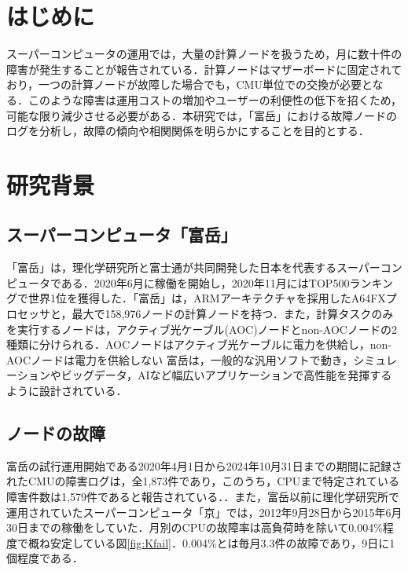 \documentclass[a4paper,11pt,twocolumn]{jsarticle}
\begin{document}

\section{はじめに}
スーパーコンピュータの運用では，大量の計算ノードを扱うため，月に数十件の障害が発生することが報告されている\cite{HPC_system_fail}．計算ノードはマザーボードに固定されており，一つの計算ノードが故障した場合でも，CMU単位での交換が必要となる．このような障害は運用コストの増加やユーザーの利便性の低下を招くため，可能な限り減少させる必要がある．本研究では，「富岳」における故障ノードのログを分析し，故障の傾向や相関関係を明らかにすることを目的とする．


\section{研究背景}

\subsection{スーパーコンピュータ「富岳」}\label{sec:fugaku}
「富岳」は，理化学研究所と富士通が共同開発した日本を代表するスーパーコンピュータである．2020年6月に稼働を開始し，2020年11月にはTOP500ランキングで世界1位を獲得した\cite{HPCG}．「富岳」は，ARMアーキテクチャを採用したA64FXプロセッサと，最大で158,976ノードの計算ノードを持つ\cite{Fugaku_Web}．また，計算タスクのみを実行するノードは，アクティブ光ケーブル(AOC)ノードとnon-AOCノードの2種類に分けられる．AOCノードはアクティブ光ケーブルに電力を供給し，non-AOCノードは電力を供給しない
富岳は，一般的な汎用ソフトで動き，シミュレーションやビッグデータ，AIなど幅広いアプリケーションで高性能を発揮するように設計されている．

\subsection{ノードの故障}
富岳の試行運用開始である2020年4月1日から2024年10月31日までの期間に記録されたCMUの障害ログは，全1,873件であり，このうち，CPUまで特定されている障害件数は1,579件であると報告されている．\cite{master_kusaba}．また，富岳以前に理化学研究所で運用されていたスーパーコンピュータ「京」では，2012年9月28日から2015年6月30日までの稼働をしていた．月別のCPUの故障率は高負荷時を除いて0.004\%程度で概ね安定している\cite{k_HPC}図\ref{fig:Kfail}．0.004\%とは毎月3.3件の故障であり，9日に1個程度である．
\end{document}
